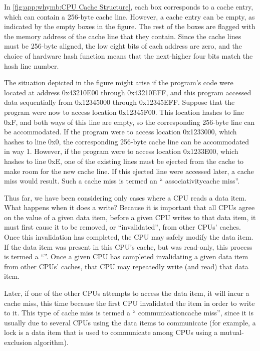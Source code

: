 In \cref{fig:app:whymb:CPU Cache Structure},
each box corresponds to a cache entry, which
can contain a 256-byte cache line.
However, a cache entry can be empty, as indicated by the empty boxes
in the figure.
The rest of the boxes are flagged with the memory address of the cache line
that they contain.
Since the cache lines must be 256-byte aligned, the low eight bits of
each address are
zero, and the choice of hardware hash function means that the next-higher
four bits match the hash line number.

The situation depicted in the figure might arise if the program's code
were located at address 0x43210E00 through 0x43210EFF, and this program
accessed data sequentially from 0x12345000 through 0x12345EFF\@.
Suppose that the program were now to access location 0x12345F00.
This location hashes to line 0xF, and both ways of this line are
empty, so the corresponding 256-byte line can be accommodated.
If the program were to access location 0x1233000, which hashes to line
0x0, the corresponding 256-byte cache line can be accommodated in
way 1.
However, if the program were to access location 0x1233E00, which hashes
to line 0xE, one of the existing lines must be ejected from the cache
to make room for the new cache line.
If this ejected line were accessed later, a cache miss would result.
Such a cache miss is termed an ``
{associativity}{cache miss}''.

Thus far, we have been considering only cases where a CPU reads
a data item.
What happens when it does a write?
Because it is important that all CPUs agree on the value of a given
data item, before a given CPU writes to that data item, it must first
cause it to be removed, or ``invalidated'', from other CPUs' caches.
Once this invalidation has completed, the CPU may safely modify the
data item.
If the data item was present in this CPU's cache, but was read-only,
this process is termed a ``''.
Once a given CPU has completed invalidating a given data item from other
CPUs' caches, that CPU may repeatedly write (and read) that data item.

Later, if one of the other CPUs attempts to access the data item, it
will incur a cache miss, this time because the first CPU invalidated
the item in order to write to it.
This type of cache miss is termed a ``
{communication}{cache miss}'', since it
is usually due to several CPUs using the data items to communicate
(for example, a lock is a data item that is used to communicate among
CPUs using a mutual-exclusion algorithm).

